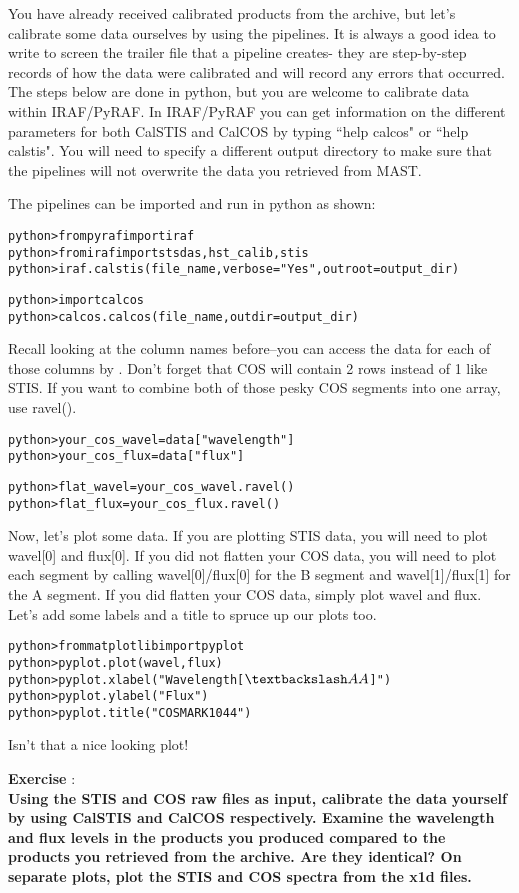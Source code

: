 You have already received calibrated products from the archive, but let's calibrate some data ourselves by using the pipelines.  It is always a good idea to write to screen the trailer file that a pipeline creates- they are step-by-step records of how the data were calibrated and will record any errors that occurred. The steps below are done in python, but you are welcome to calibrate data within IRAF/PyRAF. In IRAF/PyRAF you can get information on the different parameters for both CalSTIS and CalCOS by typing ``help calcos" or ``help calstis". You will need to specify a different output directory to make sure that the pipelines will not overwrite the data you retrieved from MAST.

The pipelines can be imported and run in python as shown:
\begin{alltt}
python> from pyraf import iraf
python> from iraf import stsdas, hst_calib, stis
python> iraf.calstis(file_name, verbose = "Yes", outroot=output_dir)

python> import calcos
python> calcos.calcos(file_name, outdir=output_dir)
\end{alltt}
Recall looking at the column names before--you can access the data for each of those columns by {\color{red}{indexing the science data extension and the column name}}. Don't forget that COS will contain 2 rows instead of 1 like STIS. If you want to combine both of those pesky COS segments into one array, use ravel(). 
\begin{alltt}
python> your_cos_wavel = data["wavelength"]
python> your_cos_flux = data["flux"]

python> flat_wavel = your_cos_wavel.ravel()
python> flat_flux = your_cos_flux.ravel()
\end{alltt}
Now, let's plot some data. If you are plotting STIS data, you will need to plot wavel[0] and flux[0]. If you did not flatten your COS data, you will need to plot each segment by calling wavel[0]/flux[0] for the B segment and wavel[1]/flux[1] for the A segment. If you did flatten your COS data, simply plot wavel and flux. Let's add some labels and a title to spruce up our plots too.
\begin{alltt}
python> from matplotlib import pyplot
python> pyplot.plot(wavel, flux)
python> pyplot.xlabel("Wavelength [$\textbackslash AA$]")
python> pyplot.ylabel("Flux")
python> pyplot.title("COS MARK1044")
\end{alltt}
Isn't that a nice looking plot!

{\bf \color{blue} Exercise  }:  \\
{\bf Using the STIS and COS raw files as input, calibrate the data yourself by using CalSTIS and CalCOS respectively. Examine the wavelength and flux levels in the products you produced compared to the products you retrieved from the archive. Are they identical? On separate plots, plot the STIS and COS spectra from the x1d files.}

